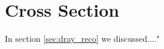 \section{\deltaray Cross Section}
\label{sec:xsec}
In section \ref{sec:dray_reco} we discussed...."
